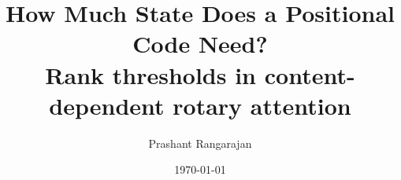 \documentclass[11pt]{article}
\title{How Much State Does a Positional Code Need?\\
       Rank thresholds in content-dependent rotary attention}
\author{Prashant Rangarajan}
\date{\today}
\begin{document}
\maketitle
\begin{abstract}\end{abstract}











\end{document}
